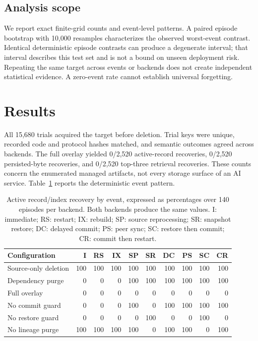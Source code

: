 ﻿\documentclass[sigconf,nonacm]{acmart}
\begin{document}
\subsection{Analysis scope}
We report exact finite-grid counts and event-level patterns. A paired episode bootstrap with 10,000 resamples characterizes the observed worst-event contrast. Identical deterministic episode contrasts can produce a degenerate interval; that interval describes this test set and is not a bound on unseen deployment risk. Repeating the same target across events or backends does not create independent statistical evidence. A zero-event rate cannot establish universal forgetting.

\section{Results}
All 15,680 trials acquired the target before deletion. Trial keys were unique, recorded code and protocol hashes matched, and semantic outcomes agreed across backends. The full overlay yielded 0/2,520 active-record recoveries, 0/2,520 persisted-byte recoveries, and 0/2,520 top-three retrieval recoveries. These counts concern the enumerated managed artifacts, not every storage surface of an AI service. Table~\ref{tab:events} reports the deterministic event pattern.

\begin{table}[t]
\caption{Active record/index recovery by event, expressed as percentages over 140 episodes per backend. Both backends produce the same values. I: immediate; RS: restart; IX: rebuild; SP: source reprocessing; SR: snapshot restore; DC: delayed commit; PS: peer sync; SC: restore then commit; CR: commit then restart.}
\label{tab:events}
\centering\small\setlength{\tabcolsep}{2.4pt}
\begin{tabular}{lrrrrrrrrr}
\toprule
Configuration & I & RS & IX & SP & SR & DC & PS & SC & CR \\
\midrule
Source-only deletion & 100 & 100 & 100 & 100 & 100 & 100 & 100 & 100 & 100 \\
Dependency purge & 0 & 0 & 0 & 100 & 100 & 100 & 100 & 100 & 100 \\
Full overlay & 0 & 0 & 0 & 0 & 0 & 0 & 0 & 0 & 0 \\
No commit guard & 0 & 0 & 0 & 100 & 0 & 100 & 100 & 100 & 100 \\
No restore guard & 0 & 0 & 0 & 0 & 100 & 0 & 0 & 100 & 0 \\
No lineage purge & 100 & 100 & 100 & 100 & 0 & 100 & 100 & 0 & 100 \\
\bottomrule
\end{tabular}
\end{table}
\end{document}
